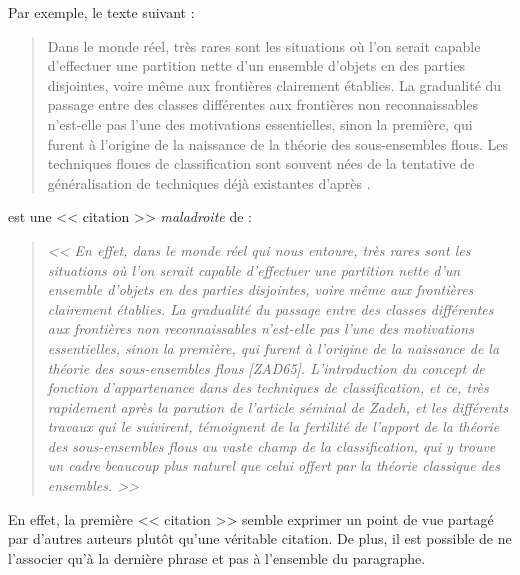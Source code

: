 \documentclass[11pt, french]{report-rd-info}
\begin{document}
Par exemple, le texte suivant :
\begin{quote}
   Dans le monde réel, très rares sont les situations où l'on serait capable d'effectuer une partition nette d'un ensemble d'objets en des parties disjointes, voire même aux frontières clairement établies. La gradualité du passage entre des classes différentes aux frontières non reconnaissables n'est-elle pas l'une des motivations essentielles, sinon la première, qui furent à l'origine de la naissance de la théorie des sous-ensembles flous. Les techniques floues de classification sont souvent nées de la tentative de généralisation de techniques déjà existantes d'après \cite{Khodja-97}.
\end{quote}
est une << citation >> \emph{maladroite} de :
\begin{quote}
   \emph{<< En effet, dans le monde réel qui nous entoure, très rares sont les situations où l'on serait capable d'effectuer une partition nette d'un ensemble d'objets en des parties disjointes, voire même aux frontières clairement établies. La gradualité du passage entre des classes différentes aux frontières non reconnaissables n'est-elle pas l'une des motivations essentielles, sinon la première, qui furent à l'origine de la naissance de la théorie des sous-ensembles flous [ZAD65]. L'introduction du concept de fonction d'appartenance dans des techniques de classification, et ce, très rapidement après la parution de l'article séminal de Zadeh, et les différents travaux qui le suivirent, témoignent de la fertilité de l'apport de la théorie des sous-ensembles flous au vaste champ de la classification, qui y trouve un cadre beaucoup plus naturel que celui offert par la théorie classique des ensembles. >>} \cite{Khodja-97}
\end{quote}

En effet, la première << citation >> semble exprimer un point de vue partagé par d'autres auteurs plutôt qu'une véritable citation. De plus, il est possible de ne l'associer qu'à la dernière phrase et pas à l'ensemble du paragraphe.

\bigskip
\end{document}
